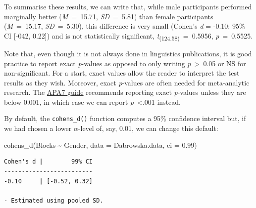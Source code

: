 \documentclass[
  letterpaper,
  DIV=11,
  numbers=noendperiod]{scrreprt}
\newenvironment{Shaded}{\begin{snugshade}}{\end{snugshade}}
\newcommand{\AttributeTok}[1]{\textcolor[rgb]{0.40,0.45,0.13}{#1}}
\newcommand{\FloatTok}[1]{\textcolor[rgb]{0.68,0.00,0.00}{#1}}
\newcommand{\FunctionTok}[1]{\textcolor[rgb]{0.28,0.35,0.67}{#1}}
\newcommand{\NormalTok}[1]{\textcolor[rgb]{0.00,0.23,0.31}{#1}}
\newcommand{\SpecialCharTok}[1]{\textcolor[rgb]{0.37,0.37,0.37}{#1}}
\begin{document}
\begin{tcolorbox}[enhanced jigsaw, arc=.35mm, bottomrule=.15mm, bottomtitle=1mm, breakable, colback=white, colbacktitle=quarto-callout-note-color!10!white, colframe=quarto-callout-note-color-frame, coltitle=black, left=2mm, leftrule=.75mm, opacityback=0, opacitybacktitle=0.6, rightrule=.15mm, title=\textcolor{quarto-callout-note-color}{\faInfo}\hspace{0.5em}{How to report \emph{p}-values, effect sizes, and confidence intervals}, titlerule=0mm, toprule=.15mm, toptitle=1mm]

To summarise these results, we can write that, while male participants
performed marginally better (\emph{M}~=~15.71, \emph{SD}~=~5.81) than
female participants (\emph{M}~=~15.17, \emph{SD}~=~5.30), this
difference is very small (Cohen's \emph{d} = -0.10; 95\% CI {[}-042,
0.22{]}) and is not statistically significant,
\emph{t}\textsubscript{(124.58)}~=~0.5956, \emph{p}~=~0.5525.

Note that, even though it is not always done in linguistics
publications, it is good practice to report exact \emph{p}-values as
opposed to only writing \emph{p}~\textgreater~0.05 or NS for
non-significant. For a start, exact values allow the reader to interpret
the test results as they wish. Moreover, exact \emph{p}-values are often
needed for meta-analytic research. The
\href{https://apastyle.apa.org/instructional-aids/numbers-statistics-guide.pdf}{APA7
guide} recommends reporting exact \emph{p}-values unless they are below
0.001, in which case we can report \emph{p}~\textless.001 instead.

\end{tcolorbox}

By default, the \texttt{cohens\_d()} function computes a 95\% confidence
interval but, if we had chosen a lower \(\alpha\)-level of, say, 0.01,
we can change this default:

\begin{Shaded}
\begin{Highlighting}[]
\FunctionTok{cohens\_d}\NormalTok{(Blocks }\SpecialCharTok{\textasciitilde{}}\NormalTok{ Gender, }
       \AttributeTok{data =}\NormalTok{ Dabrowska.data,}
       \AttributeTok{ci =} \FloatTok{0.99}\NormalTok{)}
\end{Highlighting}
\end{Shaded}

\begin{verbatim}
Cohen's d |        99% CI
-------------------------
-0.10     | [-0.52, 0.32]

- Estimated using pooled SD.
\end{verbatim}
\end{document}
